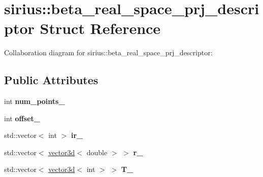 \hypertarget{structsirius_1_1beta__real__space__prj__descriptor}{}\section{sirius\+:\+:beta\+\_\+real\+\_\+space\+\_\+prj\+\_\+descriptor Struct Reference}
\label{structsirius_1_1beta__real__space__prj__descriptor}


Collaboration diagram for sirius\+:\+:beta\+\_\+real\+\_\+space\+\_\+prj\+\_\+descriptor\+:
\subsection*{Public Attributes}
\begin{DoxyCompactItemize}
\item 
\hypertarget{structsirius_1_1beta__real__space__prj__descriptor_a14cf0ad07e21ea6aed98b20a1c1d13c0}{}int {\bfseries num\+\_\+points\+\_\+}\label{structsirius_1_1beta__real__space__prj__descriptor_a14cf0ad07e21ea6aed98b20a1c1d13c0}

\item 
\hypertarget{structsirius_1_1beta__real__space__prj__descriptor_a4447735efb27ddd081ff6ed39d118878}{}int {\bfseries offset\+\_\+}\label{structsirius_1_1beta__real__space__prj__descriptor_a4447735efb27ddd081ff6ed39d118878}

\item 
\hypertarget{structsirius_1_1beta__real__space__prj__descriptor_a192f69e29f2fc965fae2523ab59cf8cd}{}std\+::vector$<$ int $>$ {\bfseries ir\+\_\+}\label{structsirius_1_1beta__real__space__prj__descriptor_a192f69e29f2fc965fae2523ab59cf8cd}

\item 
\hypertarget{structsirius_1_1beta__real__space__prj__descriptor_ad9f847aa15abc7a71bce739a9f027f0e}{}std\+::vector$<$ \hyperlink{classgeometry3d_1_1vector3d}{vector3d}$<$ double $>$ $>$ {\bfseries r\+\_\+}\label{structsirius_1_1beta__real__space__prj__descriptor_ad9f847aa15abc7a71bce739a9f027f0e}

\item 
\hypertarget{structsirius_1_1beta__real__space__prj__descriptor_a4b929ad213a665d828d9440bf3e46e2d}{}std\+::vector$<$ \hyperlink{classgeometry3d_1_1vector3d}{vector3d}$<$ int $>$ $>$ {\bfseries T\+\_\+}\label{structsirius_1_1beta__real__space__prj__descriptor_a4b929ad213a665d828d9440bf3e46e2d}


\end{DoxyCompactItemize}
